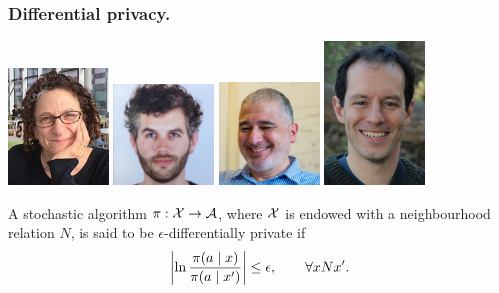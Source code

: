 \begin{frame}
  \frametitle{Differential privacy.}
  \includegraphics[width=0.2\textwidth]{../figures/dwork} \hspace{1em}
  \includegraphics[width=0.2\textwidth]{../figures/mcsherry} \hspace{1em}
  \includegraphics[width=0.2\textwidth]{../figures/nissim} \hspace{1em}
  \includegraphics[width=0.2\textwidth]{../figures/smith}
  
  \begin{definition}
    A stochastic algorithm $\pi : {\mathcal{X}} \to {\mathcal{A}}$, where ${\mathcal{X}}$ is endowed with a neighbourhood relation $N$, is said to be $\epsilon$-differentially private if
    \begin{equation}
      \label{eq:epsilon-dp}
      \left|\ln \frac{\pi(a \mid x)}{\pi(a \mid x')}\right| \leq \epsilon , \qquad \forall x N x'.
    \end{equation}
  \end{definition}
  

\end{frame}
